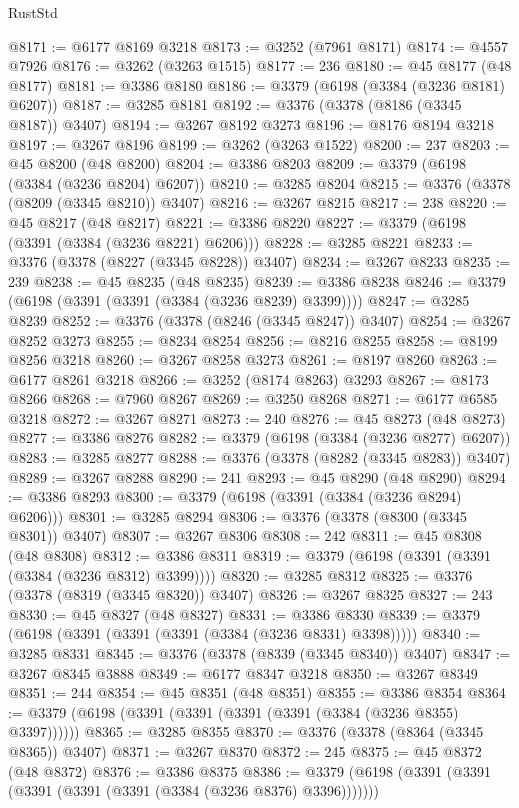 \begin{lexlean}{RustStd}
\begin{coremodule}
{\begin{coremodule}
{{{{{{{{{{{{{{{{{{{{{{{{{{{{{{{{{{{{{{{@8171 := @6177 @8169 @3218
@8173 := @3252 (@7961 @8171)
@8174 := @4557 @7926
@8176 := @3262 (@3263 @1515)
@8177 := 236
@8180 := @45 @8177 (@48 @8177)
@8181 := @3386 @8180
@8186 := @3379 (@6198 (@3384 (@3236 @8181) @6207))
@8187 := @3285 @8181
@8192 := @3376 (@3378 (@8186 (@3345 @8187)) @3407)
@8194 := @3267 @8192 @3273
@8196 := @8176 @8194 @3218
@8197 := @3267 @8196
@8199 := @3262 (@3263 @1522)
@8200 := 237
@8203 := @45 @8200 (@48 @8200)
@8204 := @3386 @8203
@8209 := @3379 (@6198 (@3384 (@3236 @8204) @6207))
@8210 := @3285 @8204
@8215 := @3376 (@3378 (@8209 (@3345 @8210)) @3407)
@8216 := @3267 @8215
@8217 := 238
@8220 := @45 @8217 (@48 @8217)
@8221 := @3386 @8220
@8227 := @3379 (@6198 (@3391 (@3384 (@3236 @8221) @6206)))
@8228 := @3285 @8221
@8233 := @3376 (@3378 (@8227 (@3345 @8228)) @3407)
@8234 := @3267 @8233
@8235 := 239
@8238 := @45 @8235 (@48 @8235)
@8239 := @3386 @8238
@8246 := @3379 (@6198 (@3391 (@3391 (@3384 (@3236 @8239) @3399))))
@8247 := @3285 @8239
@8252 := @3376 (@3378 (@8246 (@3345 @8247)) @3407)
@8254 := @3267 @8252 @3273
@8255 := @8234 @8254
@8256 := @8216 @8255
@8258 := @8199 @8256 @3218
@8260 := @3267 @8258 @3273
@8261 := @8197 @8260
@8263 := @6177 @8261 @3218
@8266 := @3252 (@8174 @8263) @3293
@8267 := @8173 @8266
@8268 := @7960 @8267
@8269 := @3250 @8268
@8271 := @6177 @6585 @3218
@8272 := @3267 @8271
@8273 := 240
@8276 := @45 @8273 (@48 @8273)
@8277 := @3386 @8276
@8282 := @3379 (@6198 (@3384 (@3236 @8277) @6207))
@8283 := @3285 @8277
@8288 := @3376 (@3378 (@8282 (@3345 @8283)) @3407)
@8289 := @3267 @8288
@8290 := 241
@8293 := @45 @8290 (@48 @8290)
@8294 := @3386 @8293
@8300 := @3379 (@6198 (@3391 (@3384 (@3236 @8294) @6206)))
@8301 := @3285 @8294
@8306 := @3376 (@3378 (@8300 (@3345 @8301)) @3407)
@8307 := @3267 @8306
@8308 := 242
@8311 := @45 @8308 (@48 @8308)
@8312 := @3386 @8311
@8319 := @3379 (@6198 (@3391 (@3391 (@3384 (@3236 @8312) @3399))))
@8320 := @3285 @8312
@8325 := @3376 (@3378 (@8319 (@3345 @8320)) @3407)
@8326 := @3267 @8325
@8327 := 243
@8330 := @45 @8327 (@48 @8327)
@8331 := @3386 @8330
@8339 := @3379 (@6198 (@3391 (@3391 (@3391 (@3384 (@3236 @8331) @3398)))))
@8340 := @3285 @8331
@8345 := @3376 (@3378 (@8339 (@3345 @8340)) @3407)
@8347 := @3267 @8345 @3888
@8349 := @6177 @8347 @3218
@8350 := @3267 @8349
@8351 := 244
@8354 := @45 @8351 (@48 @8351)
@8355 := @3386 @8354
@8364 := @3379 (@6198 (@3391 (@3391 (@3391 (@3391 (@3384 (@3236 @8355) @3397))))))
@8365 := @3285 @8355
@8370 := @3376 (@3378 (@8364 (@3345 @8365)) @3407)
@8371 := @3267 @8370
@8372 := 245
@8375 := @45 @8372 (@48 @8372)
@8376 := @3386 @8375
@8386 := @3379 (@6198 (@3391 (@3391 (@3391 (@3391 (@3391 (@3384 (@3236 @8376) @3396)))))))
}}}}}}}}}}}}}}}}}}}}}}}}}}}}}}}}}}}}}}}
\end{coremodule}}
\end{coremodule}
\end{lexlean}
